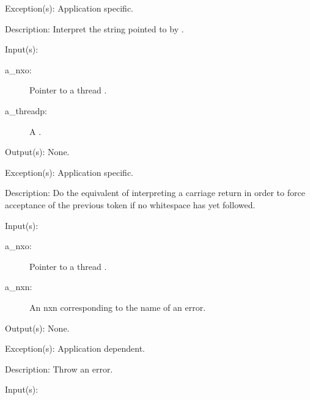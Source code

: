 \begin{capi}
\begin{capilist}
	\item[Exception(s): ] Application specific.
	\item[Description: ]
		Interpret the string pointed to by .
	\end{capilist}
\label{nxo_thread_flush}
	\begin{capilist}
	\item[Input(s): ]
		\begin{description}\item[]
		\item[a\_nxo: ]
			Pointer to a thread .
		\item[a\_threadp: ]
			A .
		\end{description}
	\item[Output(s): ] None.
	\item[Exception(s): ] Application specific.
	\item[Description: ]
		Do the equivalent of interpreting a carriage return in order to
		force acceptance of the previous token if no whitespace has yet
		followed.
	\end{capilist}
\label{nxo_thread_nerror}
	\begin{capilist}
	\item[Input(s): ]
		\begin{description}\item[]
		\item[a\_nxo: ]
			Pointer to a thread \classname{nxo}.
		\item[a\_nxn: ]
			An nxn corresponding to the name of an error.
		\end{description}
	\item[Output(s): ] None.
	\item[Exception(s): ] Application dependent.
	\item[Description: ]
		Throw an error.
	\end{capilist}
\label{nxo_thread_serror}
	\begin{capilist}
	\item[Input(s): ]
		\begin{description}\item[]

\end{description}
\end{capilist}
\end{capi}
